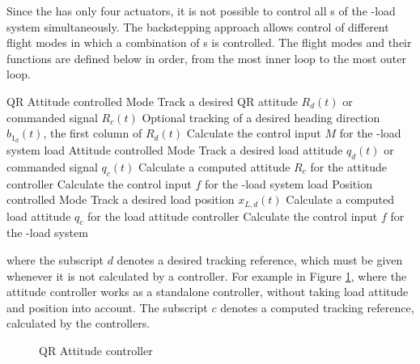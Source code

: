 Since the  has only four actuators, it is not possible to control all s of the -load system simultaneously. The backstepping approach allows control of different flight modes in which a combination of s is controlled. The flight modes and their functions are defined below in order, from the most inner loop to the most outer loop.
\begin{outline}
	\1 QR Attitude controlled Mode 
	\2 Track a desired QR attitude $ R_d(t) $ or commanded signal $ R_c(t) $
	\2Optional tracking of a desired heading direction $ b_{1_d}(t) $, the first column of $ R_d(t) $
	\2 Calculate the control input $ M $ for the -load system
	\1 load Attitude controlled Mode 
	\2 Track a desired load attitude $ q_d(t) $ or commanded signal $ q_c(t) $
	\2 Calculate a computed  attitude $ R_c $ for the  attitude controller
	\2 Calculate the control input $ f $ for the -load system	
	\1 load Position controlled Mode
	\2 Track a desired load position $ x_{L,d}(t) $
	\2 Calculate a computed load attitude $ q_c $ for the load attitude controller
	\2 Calculate the control input $ f $ for the -load system		
\end{outline}
where the subscript $d $ denotes a desired tracking reference, which must be given whenever it is not calculated by a controller. For example in Figure \ref{fig:con.qrattalone}, where the  attitude controller works as a standalone controller, without taking load attitude and position into account.
The subscript $ c $ denotes a computed tracking reference, calculated by the controllers. 
\begin{figure}[h!]
	\centering
	\caption{QR Attitude controller\label{fig:con.qrattalone}}
\end{figure}		



